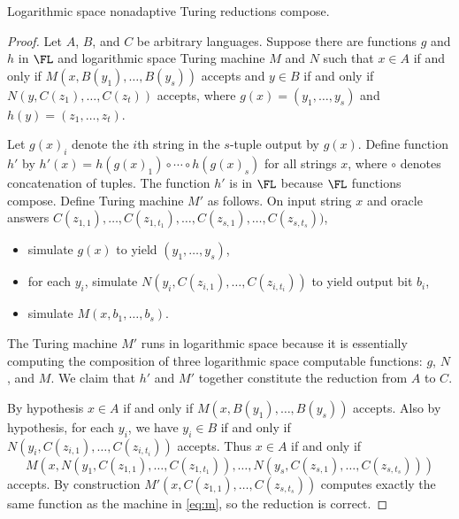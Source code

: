 \documentclass{article}
\begin{document}
\begin{lemma}\label{lem:compose}
  Logarithmic space nonadaptive Turing reductions compose.
\end{lemma}
\begin{proof}
  Let $A$, $B$, and $C$ be arbitrary languages.
  Suppose there are functions $g$ and $h$ in $\FL$ and logarithmic space Turing machine $M$ and $N$ such that $x \in A$ if and only if $M(x, B(y_1), \dotsc, B(y_s))$ accepts and $y \in B$ if and only if $N(y, C(z_1), \dotsc, C(z_t))$ accepts, where $g(x) = (y_1, \dotsc, y_s)$ and $h(y) = (z_1, \dotsc, z_t)$.

  Let $g(x)_i$ denote the $i$th string in the $s$-tuple output by $g(x)$.
  Define function $h'$ by $h'(x) = h(g(x)_1) \circ \dotsb \circ h(g(x)_s)$ for all strings $x$, where $\circ$ denotes concatenation of tuples.
  The function $h'$ is in $\FL$ because $\FL$ functions compose.
  Define Turing machine $M'$ as follows.
  On input string $x$ and oracle answers $C(z_{1, 1}), \dotsc, C(z_{1, t_1}), \dotsc, C(z_{s, 1}), \dotsc, C(z_{s, t_s}))$,
  \begin{itemize}
  \item simulate $g(x)$ to yield $(y_1, \dotsc, y_s)$,
  \item for each $y_i$, simulate $N(y_i, C(z_{i, 1}), \dotsc, C(z_{i, t_i}))$ to yield output bit $b_i$,
  \item simulate $M(x, b_1, \dotsc, b_s)$.
  \end{itemize}
  The Turing machine $M'$ runs in logarithmic space because it is essentially computing the composition of three logarithmic space computable functions: $g$, $N$, and $M$.
  We claim that $h'$ and $M'$ together constitute the reduction from $A$ to $C$.

  By hypothesis $x \in A$ if and only if $M(x, B(y_1), \dotsc, B(y_s))$ accepts.
  Also by hypothesis, for each $y_i$, we have $y_i \in B$ if and only if $N(y_i, C(z_{i, 1}), \dotsc, C(z_{i, t_i}))$ accepts.
  Thus $x \in A$ if and only if
  \begin{equation}\label{eq:m}
    M(x, N(y_1, C(z_{1, 1}), \dotsc, C(z_{1, t_1})), \dotsc, N(y_s, C(z_{s, 1}), \dotsc, C(z_{s, t_s})))
  \end{equation}
  accepts.
  By construction $M'(x, C(z_{1, 1}), \dotsc, C(z_{s, t_s}))$ computes exactly the same function as the machine in \eqref{eq:m}, so the reduction is correct.
\end{proof}
\end{document}
